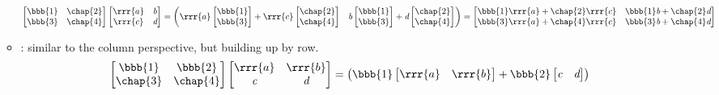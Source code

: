 \begin{itemize}
\begin{itemize}
    \[%
      \begin{bmatrix} \bbb{1} & \chap{2} \\ \bbb{3} & \chap{4} \end{bmatrix}
      \begin{bmatrix} \rrr{a} & \emph{b} \\ \rrr{c} & \emph{d} \end{bmatrix}
      =
      \begin{pmatrix}
      \rrr{a} \begin{bmatrix} \bbb{1} \\ \bbb{3} \end{bmatrix} + \rrr{c} \begin{bmatrix} \chap{2} \\ \chap{4} \end{bmatrix} &
      \emph{b} \begin{bmatrix} \bbb{1} \\ \bbb{3} \end{bmatrix} + \emph{d} \begin{bmatrix} \chap{2} \\ \chap{4} \end{bmatrix}
      \end{pmatrix}
      =
      \begin{bmatrix}
        \bbb{1}\rrr{a} + \chap{2}\rrr{c} & \bbb{1}\emph{b}+\chap{2}\emph{d} \\ \bbb{3}\rrr{a}+  \chap{4}\rrr{c} & \bbb{3}\emph{b}+\chap{4}\emph{d} 
      \end{bmatrix}
    \]%
    \item {}: similar to the column perspective, but building up by row. 
    \[%
    \begin{bmatrix} \bbb{1} & \bbb{2} \\ \chap{3} & \chap{4} \end{bmatrix}
    \begin{bmatrix} \rrr{a} & \rrr{b} \\ \emph{c} & \emph{d} \end{bmatrix}
    =
    \begin{pmatrix}
    \bbb{1} \begin{bmatrix} \rrr{a} & \rrr{b} \end{bmatrix} + 
    \bbb{2} \begin{bmatrix} \emph{c} & \emph{d} \end{bmatrix} \\

\end{pmatrix}\]
\end{itemize}
\end{itemize}
